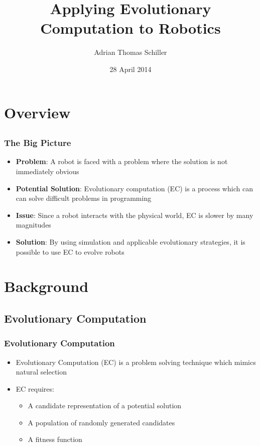 \documentclass{beamer}
\title[Applying EC to Robotics]{Applying Evolutionary Computation to Robotics}
\author[Schiller]{Adrian Thomas Schiller}
\institute[U of Minn, Morris]
{
  Division of Science and Mathematics \\
  University of Minnesota, Morris \\
  Morris, Minnesota, USA
}
\date%
{28 April 2014}
\begin{document}
\begin{frame}
  \titlepage
\end{frame}

\section*{Overview}
\subsection*{}
\begin{frame}
  \frametitle{The Big Picture}
  \begin{itemize}
    \item \textbf{Problem}: A robot is faced with a problem where the solution is not immediately obvious
        \item \textbf{Potential Solution}: Evolutionary computation (EC) is a process which can can solve difficult problems in programming
        \item \textbf{Issue}: Since a robot interacts with the physical world, EC is slower by many magnitudes 
        \item \textbf{Solution}: By using simulation and applicable evolutionary strategies, it is possible to use EC to evolve robots
  \end{itemize}

\end{frame}


\section{Background}
	\subsection{Evolutionary Computation}
\begin{frame}
\frametitle{Evolutionary Computation}
 \begin{itemize}
\item Evolutionary Computation (EC) is a problem solving technique which mimics natural selection
\item EC requires:
\begin{itemize}
  \item A candidate representation of a potential solution
  \item A population of randomly generated candidates
  \item A fitness function
\end{itemize}
  \end{itemize}
\end{frame}
\end{document}
